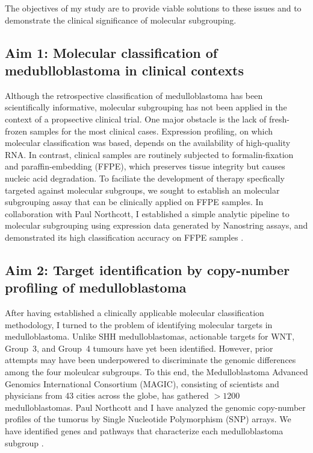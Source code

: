 \documentclass[11pt,letterpaper]{article}
\theoremstyle{definition}
\begin{document}
The objectives of my study are to provide viable solutions to these issues and to demonstrate the clinical significance of molecular subgrouping.

\subsection{Aim 1: Molecular classification of medublloblastoma in clinical contexts}

Although the retrospective classification of medulloblastoma has been scientifically informative, molecular subgrouping has not been applied in the context of a propsective clinical trial. One major obstacle is the lack of fresh-frozen samples for the most clinical cases. Expression profiling, on which molecular classification was based, depends on the availability of high-quality RNA. In contrast, clinical samples are routinely subjected to formalin-fixation and paraffin-embedding (FFPE), which preserves tissue integrity but causes nucleic acid degradation. To faciliate the development of therapy specfically targeted against molecular subgroups, we sought to establish an molecular subgrouping assay that can be clinically applied on FFPE samples. In collaboration with Paul Northcott, I established a simple analytic pipeline to molecular subgrouping using expression data generated by Nanostring assays, and demonstrated its high classification accuracy on FFPE samples .

\subsection{Aim 2: Target identification by copy-number profiling of medulloblastoma}

After having established a clinically applicable molecular classification methodology, I turned to the problem of identifying molecular targets in medulloblastoma. Unlike SHH medulloblastomas, actionable targets for WNT, Group~3, and Group~4 tumours have yet been identified. However, prior attempts may have been underpowered to discriminate the genomic differences among the four moleulcar subgroups. To this end, the Medulloblastoma Advanced Genomics International Consortium (MAGIC), consisting of scientists and physicians from 43 cities across the globe, has gathered $>1200$ medulloblastomas. Paul Northcott and I have analyzed the genomic copy-number profiles of the tumorus by Single Nucleotide Polymorphism (SNP) arrays. We have identified genes and pathways that characterize each medulloblastoma subgroup .
\end{document}
